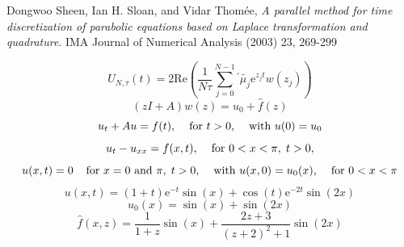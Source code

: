 \documentclass[letterpaper, 12pt]{article}
\def\e{\text{e}}
\begin{document}
	\begin{thebibliography}{1}
			Dongwoo Sheen, Ian H. Sloan, and Vidar Thom\'{e}e,
			\emph{A parallel method for time discretization of parabolic equations based on Laplace transformation and quadrature}.
			IMA Journal of Numerical Analysis (2003) 23,
			269-299
			
	\end{thebibliography}
	
 
 $$U_{N,\tau}(t)=2\text{Re}\left(\frac{1}{N\tau}\sum_{j=0}^{N-1}{}^\prime \tilde{\mu_j}\e^{z_jt}w(z_j)\right)$$
 $$(zI+A)w(z)=u_0+\hat{f}(z)$$
 $$u_t+Au=f(t),\hspace{4mm}\text{for }t>0,\hspace{4mm}\text{with }u(0)=u_0$$
 $$u_t-u_{xx}=f(x,t),\hspace{4mm}\text{for }0<x<\pi,\;t>0,$$
 $$u(x,t)=0\hspace{4mm}\text{for }x=0\text{ and }\pi,\;t>0,\hspace{4mm}\text{with }u(x,0)=u_0(x),\hspace{4mm}\text{for }0<x<\pi$$
 $$u(x,t)=(1+t)\e^{-t}\sin(x)+\cos(t)\e^{-2t}\sin(2x)$$
 $$u_0(x)=\sin(x)+\sin(2x)$$
 $$\hat{f}(x,z)=\frac{1}{1+z}\sin(x)+\frac{2z+3}{(z+2)^2+1}\sin(2x)$$
 
\end{document}
